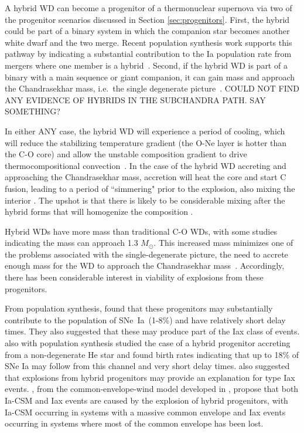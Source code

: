 \documentclass[iop,apj]{emulateapj}
\newcommand{\SNeIa}{SNe~Ia}
\newcommand{\Msun}{\ensuremath{M_\odot}}
\begin{document}
A hybrid WD can become a progenitor of a thermonuclear supernova via two
of the progenitor scenarios discussed in Section \ref{sec:progenitors}.
First, the hybrid could be part of a binary system in which the companion star becomes
another white dwarf and the two merge. Recent population synthesis work supports
this pathway by indicating a substantial contribution to the Ia population rate from
mergers where one member is a hybrid~\citep{yungelsonkuranov2017}. Second, if the hybrid
WD is part of a binary with a main sequence or giant companion, it can gain mass and
approach the Chandrasekhar mass, i.e.\  the single degenerate picture~\citep{willcoxetal2016}.
{\color{red} COULD NOT FIND ANY EVIDENCE OF HYBRIDS IN THE SUBCHANDRA PATH. SAY
SOMETHING?}

In either {\color{red}ANY} case, the hybrid WD will experience a period of cooling, 
which will reduce the stabilizing temperature gradient (the O-Ne layer is hotter 
than the C-O core) and allow the unstable composition gradient to drive 
thermocompositional convection~\citep{brooksetal2017,schwabgaraud2019}.
In the case of the
hybrid WD accreting and approaching the Chandrasekhar mass, accretion will
heat the core and start C fusion, leading to a period of ``simmering" prior
to the explosion, also mixing the interior \citep{PiroBild08}. The upshot is 
that there is likely to be considerable mixing after the hybrid forms that will 
homogenize the composition \citep{denissenkovetal2015,brooksetal2017,schwabgaraud2019}.

Hybrid WDs have more mass than traditional C-O WDs, with some studies indicating the
mass can approach 1.3 \Msun \citep{chenetal2014}. This increased mass
minimizes one of the problems associated with the single-degenerate picture,
the need to accrete enough mass for the WD to approach the Chandrasekhar
mass~\citep{chenetal2014,denissenkovetal2015,kromeretal2015}.
Accordingly, there has been considerable interest in viability of explosions from
these progenitors.

From population synthesis, \citet{mengpods2014} found that these
progenitors may substantially contribute to the population of \SNeIa\ (1-8\%) and have
relatively short delay times. They also suggested that these
may produce part of the Iax class of events. \citet{Wangetal2014} also with population
synthesis studied the case
of a hybrid progenitor accreting from a non-degenerate He star and found
birth rates indicating that up to 18\% of SNe Ia may follow from this channel
and very short delay times. \citet{Wangetal2014} also suggested that explosions
from hybrid progenitors may provide an explanation for type Iax events.
\citet{mengpods2018}, from the common-envelope-wind model developed in
\citet{mengpods2014}, propose that both Ia-CSM and Iax events
are caused by the explosion of hybrid progenitors, with Ia-CSM occurring in systems with
a massive common envelope and Iax events occurring in systems where most of the common envelope
has been lost.
\end{document}
